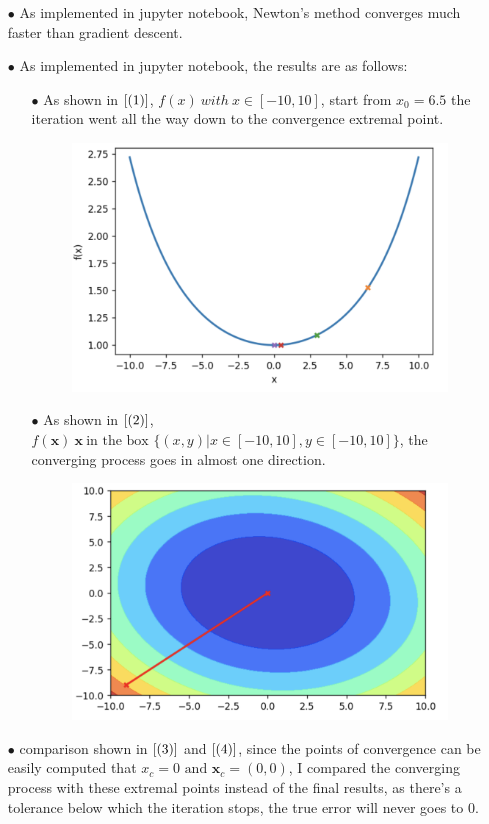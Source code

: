 \documentclass[11pt]{article}
\begin{document}
\begin{itemize}
\item[$\bullet$] As implemented in jupyter notebook, Newton's method converges much faster than gradient descent.
\item[$\bullet$] As implemented in jupyter notebook, the results are as follows:
\begin{itemize}
\item[$\bullet$] As shown in $\ref{(1)}$, $f(x)\ with\ x\in [-10, 10]$, start from $x_0 = 6.5$ the iteration went all the way down to the convergence extremal point.
\begin{figure}[htbp]
  \centering
  \includegraphics[width = .6\textwidth]{1.png}
  \caption{}
  \label{(1)}
  \end{figure}
\item[$\bullet$] As shown in $\ref{(2)}$, $f(\textbf{x}) \  \textbf{x} \ \text{in the box }\{(x,y)|x \in [-10,10], y\in [-10,10]\} $, the converging process goes in almost one direction.
\begin{figure}[htbp]
\centering
\includegraphics[width = .6\textwidth]{2.png}
\caption{}
\label{(2)}
\end{figure}
\end{itemize}
\item[$\bullet$] comparison shown in $\ref{(3)}$ and $\ref{(4)}$, since the points of convergence can be easily computed that $x_c = 0 \text{ and }\textbf{x}_c = (0, 0)$, I compared the converging process with these extremal points instead of the final results, as there's a tolerance below which the iteration stops, the true error will never goes to 0.


\end{itemize}
\end{document}
